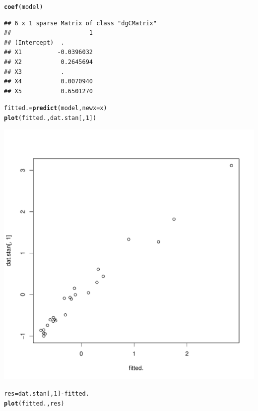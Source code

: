 \documentclass{article}\usepackage[]{graphicx}\usepackage[]{color}
\makeatletter
\def\maxwidth{ %
  \ifdim\Gin@nat@width>\linewidth
    \linewidth
  \else
    \Gin@nat@width
  \fi
}
\newcommand{\hlnum}[1]{\textcolor[rgb]{0.686,0.059,0.569}{#1}}%
\newcommand{\hlopt}[1]{\textcolor[rgb]{0,0,0}{#1}}%
\newcommand{\hlstd}[1]{\textcolor[rgb]{0.345,0.345,0.345}{#1}}%
\newcommand{\hlkwb}[1]{\textcolor[rgb]{0.69,0.353,0.396}{#1}}%
\newcommand{\hlkwc}[1]{\textcolor[rgb]{0.333,0.667,0.333}{#1}}%
\newcommand{\hlkwd}[1]{\textcolor[rgb]{0.737,0.353,0.396}{\textbf{#1}}}%
\newenvironment{kframe}{%
 \def\at@end@of@kframe{}%
 \ifinner\ifhmode%
  \def\at@end@of@kframe{\end{minipage}}%
  \begin{minipage}{\columnwidth}%
 \fi\fi%
 \def\FrameCommand##1{\hskip\@totalleftmargin \hskip-\fboxsep
 \colorbox{shadecolor}{##1}\hskip-\fboxsep
     \hskip-\linewidth \hskip-\@totalleftmargin \hskip\columnwidth}%
 \MakeFramed {\advance\hsize-\width
   \@totalleftmargin\z@ \linewidth\hsize
   \@setminipage}}%
 {\par\unskip\endMakeFramed%
 \at@end@of@kframe}
\newenvironment{knitrout}{}{} %
\makeatother
\begin{document}
\begin{enumerate}[(a)]
\begin{knitrout}
\color{fgcolor}\begin{kframe}
\begin{alltt}
  \hlkwd{coef}\hlstd{(model)}
\end{alltt}
\begin{verbatim}
## 6 x 1 sparse Matrix of class "dgCMatrix"
##                      1
## (Intercept)  .        
## X1          -0.0396032
## X2           0.2645694
## X3           .        
## X4           0.0070940
## X5           0.6501270
\end{verbatim}
\begin{alltt}
  \hlstd{fitted.} \hlkwb{=} \hlkwd{predict}\hlstd{(model,} \hlkwc{newx} \hlstd{= x)}
  \hlkwd{plot}\hlstd{(fitted., dat.stan[,}\hlnum{1}\hlstd{])}
\end{alltt}
\end{kframe}
\includegraphics[width=\maxwidth]{figure/unnamed-chunk-9-1} 
\begin{kframe}\begin{alltt}
  \hlstd{res} \hlkwb{=} \hlstd{dat.stan[,}\hlnum{1}\hlstd{]} \hlopt{-} \hlstd{fitted.}
  \hlkwd{plot}\hlstd{(fitted., res)}
\end{alltt}
\end{kframe}

\end{knitrout}
\end{enumerate}
\end{document}
